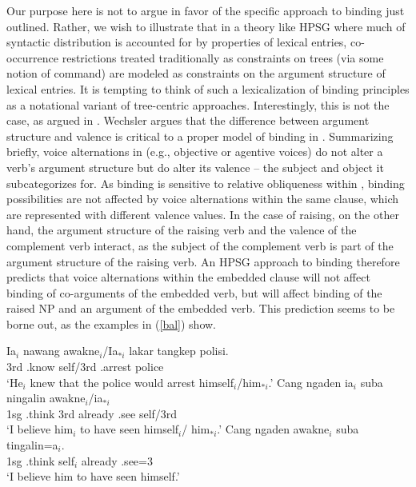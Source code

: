 \documentclass[output=paper
	        ,collection
	        ,collectionchapter
 	        ,biblatex
                ,babelshorthands
                ,newtxmath
                ,draftmode
                ,colorlinks, citecolor=brown
]{langscibook}
\begin{document}
Our purpose here is not to argue in favor of the specific approach to binding just outlined. Rather, we wish to illustrate that in a theory like HPSG where much of syntactic distribution is accounted for by properties of lexical entries, co-occurrence restrictions treated traditionally as constraints on trees (via some notion of command) are modeled as constraints on the argument structure of lexical entries. It is tempting to think of such a lexicalization of binding principles as a notational variant of tree-centric approaches. Interestingly, this is not the case, as argued in . Wechsler argues that the difference between argument structure and valence is critical to a proper model of binding in . Summarizing briefly, voice alternations in   (e.g., objective or agentive voices) do not alter a verb's argument structure but do alter its valence -- the subject and object it subcategorizes for. As binding is sensitive to relative obliqueness within , binding possibilities are not affected by voice alternations within the same clause, which are represented with different valence values. In the case of raising, on the other hand, the argument structure of the raising verb and the valence of the complement verb interact, as the subject of the complement verb is part of the argument structure of the raising verb. An HPSG approach to binding therefore predicts that voice alternations within the embedded clause will not affect binding of co-arguments of the embedded verb, but will affect binding of the raised NP and an argument of the embedded verb. This prediction seems to be borne out, as the  examples in (\ref{bal}) show. 

\begin{exe}
	\ex\label{bal}
	\begin{xlist} 
		\ex\label{bal-a}
		\gll Ia$_{i}$ nawang {awakne$_{i}$/Ia$_{*i}$ } lakar tangkep polisi. \\
		3rd .know self/3rd  .arrest police  \\
		\glt `He$_{i}$ knew that the police would arrest himself$_{i}$/him$_{*i}$.'
		\ex\label{bal-b}
		\gll Cang ngaden ia$_{i}$ suba ningalin awakne$_{i}$/ia$_{*i}$ \\
		1sg .think 3rd already .see self/3rd \\
		\glt `I believe him$_{i}$ to have seen himself$_{i}$/ him$_{*i}$.'
		\ex\label{bal-c}
		\gll Cang ngaden awakne$_{i}$ suba tingalin=a$_{i}$.\\
		1sg .think self$_{i}$ already .see=3 \\
		\glt `I believe him to have seen himself.'
	\end{xlist}
\end{exe} 
\end{document}
